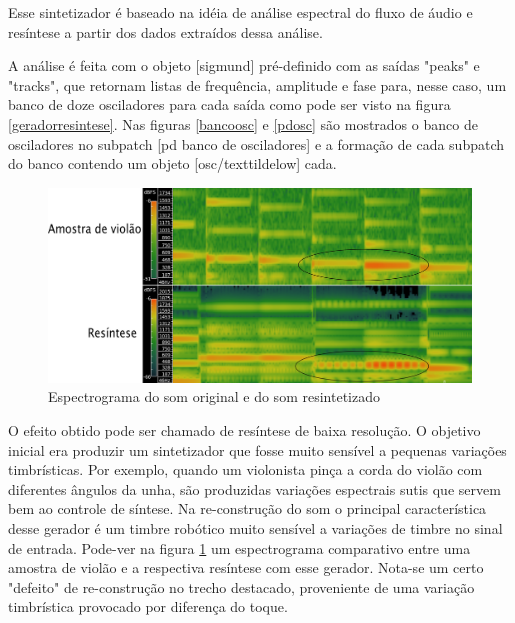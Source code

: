 \documentclass{ppgmus}
\begin{document}
Esse sintetizador é baseado na idéia de análise espectral do fluxo
de áudio e resíntese a partir dos dados extraídos dessa análise.

A análise é feita com o objeto [sigmund\texttildelow] pré-definido com
as saídas "peaks" e "tracks", que retornam listas de frequência, amplitude e 
fase para, nesse caso, um banco de doze osciladores para cada saída como pode 
ser visto na figura \ref{geradorresintese}.
Nas figuras \ref{bancoosc} e \ref{pdosc} são mostrados o banco de osciladores no subpatch
[pd banco de osciladores] e a formação de cada subpatch do banco contendo um objeto [osc/texttildelow]
cada. 


\begin{figure}
\includegraphics[scale=.5]{spectro}
\caption{Espectrograma do som original e do som resintetizado}
\label{spectro}
\end{figure}
 
O efeito obtido pode ser chamado de resíntese de baixa resolução. O objetivo
inicial era produzir um sintetizador que fosse muito sensível a pequenas
variações timbrísticas. Por exemplo, quando um violonista pinça a corda do violão
com diferentes ângulos da unha, são produzidas variações espectrais sutis que servem
bem ao controle de síntese. Na re-construção do som o principal característica desse
gerador é um timbre robótico muito sensível a variações de timbre no sinal de entrada.
Pode-ver na figura \ref{spectro} um espectrograma comparativo entre uma amostra
de violão e a respectiva resíntese com esse gerador. Nota-se um certo "defeito"
de re-construção no trecho destacado, proveniente de uma variação timbrística provocado
por diferença do toque. 

\end{document}
